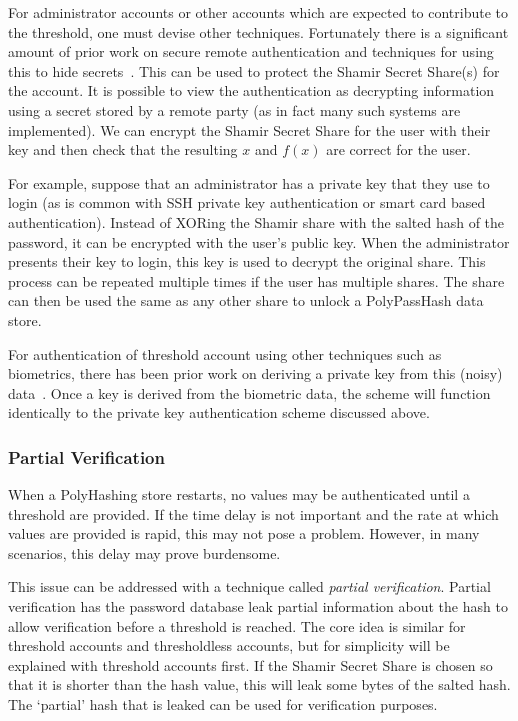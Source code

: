 For administrator accounts or other accounts which are expected to contribute
to the threshold, one must devise other techniques.   Fortunately there is
a significant amount of prior work on secure remote authentication and
techniques for using this to hide 
secrets~\cite{deo1998authentication, yang1999password}.   This can be used to 
protect the Shamir Secret Share(s) for the account.
It is possible to view the authentication as decrypting information using a 
secret stored by a remote party (as in fact many such systems are implemented).
We can encrypt the Shamir Secret Share for the user with their key and then
check that the resulting $x$ and $f(x)$ are correct for the user.   

For example, suppose that an administrator has a private key that they use
to login (as is common with SSH private key authentication or smart card
based authentication).   Instead of
XORing the Shamir share with the salted hash of the password, it can
be encrypted with the user's public key.   When the administrator presents
their key to login, this key is used to decrypt the original share.   This
process can be repeated multiple times if the user has multiple shares.
 The share can then be used the same as any other share to 
unlock a PolyPassHash data store.


For authentication of threshold account using other techniques such as 
biometrics, there has been prior work on deriving a private key from this 
(noisy) data~\cite{juels2006fuzzy}.   Once a key is derived from the biometric 
data, the scheme will function identically to the private key authentication 
scheme discussed above.




\subsubsection{Partial Verification}
\label{sec-partial}

When a PolyHashing store restarts, no values may be authenticated until a
threshold are provided.   If the time delay is not important and the rate
at which values are provided is rapid, this may not pose a problem.   However,
in many scenarios, this delay may prove burdensome.

This issue can be addressed with a technique called \emph{partial 
verification}.   Partial verification has the password database
leak partial information about the hash to allow verification before a threshold
is reached.   The core idea is similar for threshold accounts and 
thresholdless accounts, but for simplicity will be explained with threshold
accounts first.   If the Shamir Secret Share is chosen so that it is shorter
than the hash value, this will leak some bytes of the salted hash.
The `partial' hash that is leaked can be used for verification purposes.


